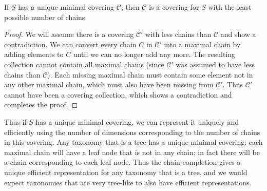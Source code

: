 \begin{prop}
If $S$ has a unique minimal covering $\mathcal{C}$, then $\mathcal{C}$ is a covering for $S$ with the least possible number of chains.
\end{prop}
\begin{proof}
We will assume there is a covering $\mathcal{C}'$ with less chains than $\mathcal{C}$ and show a contradiction. We can convert every chain $C$ in $\mathcal{C}'$ into a maximal chain by adding elements to $C$ until we can no longer add any more. The resulting collection cannot contain all maximal chains (since $\mathcal{C}'$ was assumed to have less chains than $\mathcal{C}$). Each missing maximal chain must contain some element not in any other maximal chain, which must also have been missing from $\mathcal{C}'$. Thus $\mathcal{C}'$ cannot have been a covering collection, which shows a contradiction and completes the proof.
\end{proof}

Thus if $S$ has a unique minimal covering, we can represent it uniquely and efficiently using the number of dimensions corresponding to the number of chains in this covering. Any taxonomy that is a tree has a unique minimal covering: each maximal chain will have a leaf node that is not in any chain; in fact there will be a chain corresponding to each leaf node. Thus the chain completion gives a unique efficient representation for any taxonomy that is a tree, and we would expect taxonomies that are very tree-like to also have efficient representations.


